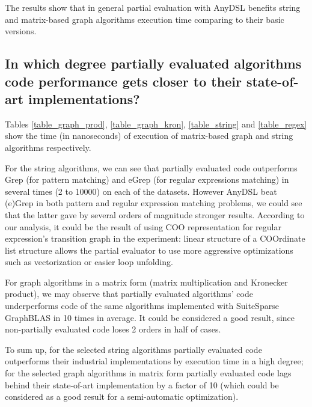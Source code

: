\documentclass[conference]{IEEEtran}
\begin{document}
The results show that in general partial evaluation with AnyDSL benefits string and matrix-based graph algorithms execution time comparing to their basic versions.


\begin{figure}
	\centering
\end{figure}

\subsection{In which degree partially evaluated algorithms code performance gets closer to their state-of-art implementations?}

Tables \ref{table_graph_prod}, \ref{table_graph_kron}, \ref{table_string} and \ref{table_regex} show the time (in nanoseconds) of execution of matrix-based graph and string algorithms respectively. 

For the string algorithms, we can see that partially evaluated code outperforms Grep (for pattern matching) and eGrep (for regular expressions matching) in several times (2 to 10000) on each of the datasets. However AnyDSL beat (e)Grep in both pattern and regular expression matching problems, we could see that the latter gave by several orders of magnitude stronger results. According to our analysis, it could be the result of using COO representation for regular expression's transition graph in the experiment: linear structure of a COOrdinate list structure allows the partial evaluator to use more aggressive optimizations such as vectorization or easier loop unfolding.

For graph algorithms in a matrix form (matrix multiplication and Kronecker product), we may observe that partially evaluated algorithms' code underperforms code of the same algorithms implemented with SuiteSparse GraphBLAS in 10 times in average. It could be considered a good result, since non-partially evaluated code loses 2 orders in half of cases.

To sum up, for the selected string algorithms partially evaluated code outperforms their industrial implementations by execution time in a high degree; for the selected graph algorithms in matrix form partially evaluated code lags behind their state-of-art implementation by a factor of 10 (which could be considered as a good result for a semi-automatic optimization).
\end{document}
